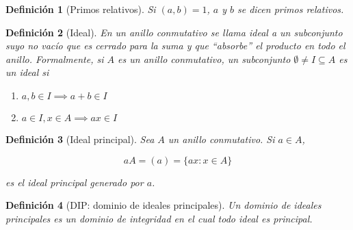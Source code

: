 \documentclass[11pt, a4paper, titlepage]{article}
\newif\IfInSansMode
\theoremstyle{theorem-style}
\theoremstyle{definition-style}
\newtheorem{ndef}{Definición}[section]
\theoremstyle{remark-style}
\theoremstyle{example-style}
\newenvironment{nlist}
{\begin{enumerate}
\renewcommand\labelenumi{(\emph{\roman{enumi})}}}
{\end{enumerate}}
\begin{document}
\begin{ndef}[Primos relativos]
  Si $(a,b) = 1$, $a$ y $b$ se dicen \emph{primos relativos}.
\end{ndef}

\begin{ndef}[Ideal]
  En un anillo conmutativo se llama ideal a un subconjunto suyo no vacío que es cerrado para la suma y que ``absorbe'' el producto en todo
  el anillo. Formalmente, si $A$ es un anillo conmutativo, un subconjunto $\emptyset \not= I\subseteq A$ es un ideal si
	\begin{nlist}
		\item $a,b\in I \implies a+b\in I$
		\item $a\in I, x\in A \implies ax \in I$
	\end{nlist}
\end{ndef}

\begin{ndef}[Ideal principal]
  Sea $A$ un anillo conmutativo. Si $a\in A$,

  $$aA=(a)=\{ax: x\in A\}$$

  es el ideal principal generado por $a$.
\end{ndef}

\begin{ndef}[DIP: dominio de ideales principales]
	Un dominio de ideales principales es un dominio de integridad en el cual todo ideal es principal.
\end{ndef}
\end{document}
